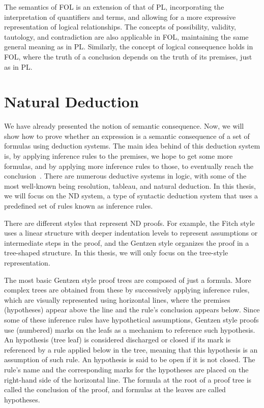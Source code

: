 The semantics of \gls{FOL} is an extension of that of \gls{PL}, incorporating the interpretation of quantifiers and terms, and allowing for a more expressive representation of logical relationships. The concepts of possibility, validity, tautology, and contradiction are also applicable in \gls{FOL}, maintaining the same general meaning as in \gls{PL}. Similarly, the concept of logical consequence holds in \gls{FOL}, where the truth of a conclusion depends on the truth of its premises, just as in \gls{PL}.

\section{Natural Deduction} 

\label{chap:prop-deduction}
We have already presented the notion of semantic consequence. Now, we will show how to prove whether an expression is a semantic consequence of a set of formulas using deduction systems. The main idea behind of this deduction system is, by applying inference rules to the premises, we hope to get some more formulas, and by applying more inference rules to those, to eventually reach the conclusion~\cite{huth_2004_logic}. There are numerous deductive systems in logic, with some of the most well-known being resolution, tableau, and natural deduction. In this thesis, we will focus on the \gls{ND} system, a type of syntactic deduction system that uses a predefined set of rules known as inference rules.

There are different styles that represent \gls{ND} proofs. For example, the Fitch style uses a linear structure with deeper indentation levels to represent assumptions or intermediate steps in the proof, and the Gentzen style organizes the proof in a tree-shaped structure. In this thesis, we will only focus on the tree-style representation.

The most basic Gentzen style proof trees are composed of just a formula. More complex trees are obtained from these by successively applying inference rules, which are visually represented using horizontal lines, where the premises (hypotheses) appear above the line and the rule’s conclusion appears below. Since some of these inference rules have hypothetical assumptions, Gentzen style proofs use (numbered) marks on the leafs as a mechanism to reference such hypothesis. An hypothesis (tree leaf) is considered discharged or closed if its mark is referenced by a rule applied below in the tree, meaning that this hypothesis is an assumption of such rule. An hypothesis is said to be open if it is not closed. The rule’s name and the corresponding marks for the hypotheses are placed on the right-hand side of the horizontal line. The formula at the root of a proof tree is called the conclusion of the proof, and formulas at the leaves are called hypotheses.   

